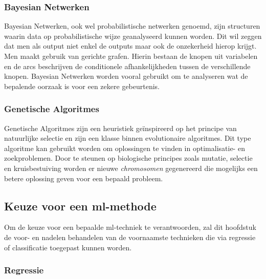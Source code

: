 	
	\subsubsection{Bayesian Netwerken}
	Bayesian Netwerken, ook wel probabilistische netwerken genoemd, zijn structuren waarin data op probabilistische wijze geanalyseerd kunnen worden. Dit wil zeggen dat men als output niet enkel de outputs maar ook de onzekerheid hierop krijgt. Men maakt gebruik van gerichte grafen. Hierin bestaan de knopen uit variabelen en de arcs beschrijven de conditionele afhankelijkheden tussen de verschillende knopen. Bayesian Netwerken worden vooral gebruikt om te analyseren wat de bepalende oorzaak is voor een zekere gebeurtenis. 
	
	\subsubsection{Genetische Algoritmes}
	Genetische Algoritmes zijn een heuristiek ge\"inspireerd op het principe van natuurlijke selectie en zijn een klasse binnen evolutionaire algoritmes. Dit type algoritme kan gebruikt worden om oplossingen te vinden in optimalisatie- en zoekproblemen. Door te steunen op biologische principes zoals mutatie, selectie en kruisbestuiving worden er nieuwe \textit{chromosomen} gegenereerd die mogelijks een betere oplossing geven voor een bepaald probleem.
	
\subsection{Keuze voor een \gls{ml}-methode }	

Om de keuze voor een bepaalde \gls{ml}-techniek te verantwoorden, zal dit hoofdstuk de voor- en nadelen behandelen van de voornaamste technieken die via regressie of classificatie toegepast kunnen worden\cite{bron:mlalgoritmes}.

	\subsubsection{Regressie}

